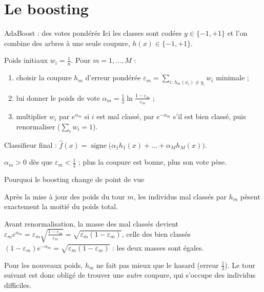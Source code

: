 \documentclass[aspectratio=169,11pt]{beamer}
\begin{document}
\section{Le boosting}

\begin{frame}{AdaBoost : des votes pondérés}
  Ici les classes sont codées $y\in\{-1,+1\}$ et l'on combine des arbres à une seule coupure, $h(x)\in\{-1,+1\}$.
  \begin{definition}[AdaBoost]
    Poids initiaux $w_i=\frac1n$. Pour $m=1,\dots,M$ :
    \begin{enumerate}\setlength\itemsep{1pt}
      \item choisir la coupure $h_m$ d'erreur pondérée $\varepsilon_m=\sum_{i:\,h_m(x_i)\ne y_i}w_i$ minimale ;
      \item lui donner le poids de vote $\alpha_m=\frac12\ln\frac{1-\varepsilon_m}{\varepsilon_m}$ ;
      \item multiplier $w_i$ par $e^{\alpha_m}$ si $i$ est mal classé, par $e^{-\alpha_m}$ s'il est bien classé, puis renormaliser ($\sum_iw_i=1$).
    \end{enumerate}
    Classifieur final : $\hat f(x)=\operatorname{signe}\big(\alpha_1h_1(x)+\dots+\alpha_Mh_M(x)\big)$.
  \end{definition}
  {\small\color{cnfGris}$\alpha_m>0$ dès que $\varepsilon_m<\frac12$ ; plus la coupure est bonne, plus son vote pèse.}
\end{frame}

\begin{frame}{Pourquoi le boosting change de point de vue}
  \begin{proposition}
    Après la mise à jour des poids du tour $m$, les individus mal classés par $h_m$ pèsent exactement la moitié du poids total.
  \end{proposition}
  \begin{preuve}
    Avant renormalisation, la masse des mal classés devient $\varepsilon_me^{\alpha_m}=\varepsilon_m\sqrt{\tfrac{1-\varepsilon_m}{\varepsilon_m}}=\sqrt{\varepsilon_m(1-\varepsilon_m)}$, celle des bien classés $(1-\varepsilon_m)e^{-\alpha_m}=\sqrt{\varepsilon_m(1-\varepsilon_m)}$ : les deux masses sont égales.
  \end{preuve}
  \begin{remarque}[Lecture]
    Pour les nouveaux poids, $h_m$ ne fait pas mieux que le hasard (erreur $\frac12$). Le tour suivant est donc obligé de trouver une \emph{autre} coupure, qui s'occupe des individus difficiles.
  \end{remarque}
\end{frame}
\end{document}
